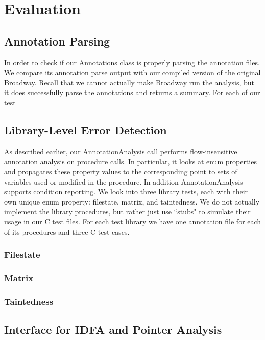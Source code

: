 \chapter{Evaluation}

\section{Annotation Parsing}
In order to check if our Annotations class is properly parsing the annotation files. We compare its annotation parse output with our compiled version of the original Broadway. Recall that we cannot actually make Broadway run the analysis, but it does successfully parse the annotations and returns a summary.  For each of our test


\section{ Library-Level Error Detection}
As described earlier, our AnnotationAnalysis call performs flow-insensitive annotation analysis on procedure calls. In particular, it looks at enum properties and propagates these property values to the corresponding point to sets of variables used or modified in the procedure. In addition AnnotationAnalysis supports condition reporting. We look into three library tests, each with their own unique enum property: filestate, matrix, and taintedness. We do not actually implement the library procedures, but rather just use ``stubs" to simulate their usage in our C test files. For each test library we have one annotation file for each of its procedures and three C test cases.

\subsection{Filestate}

\subsection{Matrix}

\subsection{Taintedness}


\section{Interface for IDFA and Pointer Analysis}

